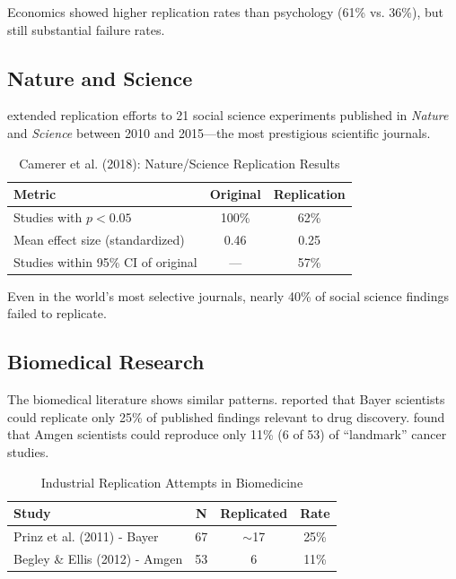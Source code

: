 \documentclass[11pt,a4paper]{article}
\begin{document}
Economics showed higher replication rates than psychology (61\% vs. 36\%), but still substantial failure rates.

\subsection{Nature and Science}

\citet{Camerer2018} extended replication efforts to 21 social science experiments published in \textit{Nature} and \textit{Science} between 2010 and 2015---the most prestigious scientific journals.

\begin{table}[h]
\centering
\caption{Camerer et al. (2018): Nature/Science Replication Results}
\label{tab:camerer2018}
\begin{tabular}{lcc}
\toprule
\textbf{Metric} & \textbf{Original} & \textbf{Replication} \\
\midrule
Studies with $p < 0.05$ & 100\% & 62\% \\
Mean effect size (standardized) & 0.46 & 0.25 \\
Studies within 95\% CI of original & --- & 57\% \\
\bottomrule
\end{tabular}
\end{table}

Even in the world's most selective journals, nearly 40\% of social science findings failed to replicate.

\subsection{Biomedical Research}

The biomedical literature shows similar patterns. \citet{Prinz2011} reported that Bayer scientists could replicate only 25\% of published findings relevant to drug discovery. \citet{Begley2012} found that Amgen scientists could reproduce only 11\% (6 of 53) of ``landmark'' cancer studies.

\begin{table}[h]
\centering
\caption{Industrial Replication Attempts in Biomedicine}
\label{tab:biomedical}
\begin{tabular}{lccc}
\toprule
\textbf{Study} & \textbf{N} & \textbf{Replicated} & \textbf{Rate} \\
\midrule
Prinz et al. (2011) - Bayer & 67 & $\sim$17 & 25\% \\
Begley \& Ellis (2012) - Amgen & 53 & 6 & 11\% \\
\bottomrule
\end{tabular}
\end{table}
\end{document}

